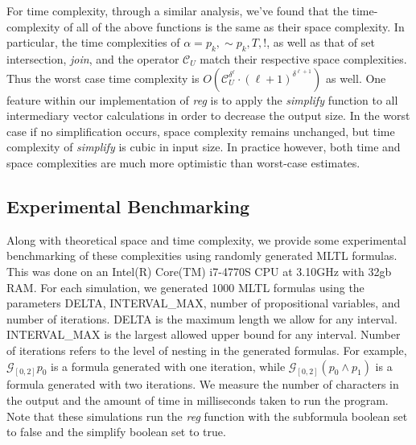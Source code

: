 \documentclass[runningheads]{llncs}
\begin{document}
For time complexity, through a similar analysis, we've found that the time-complexity of all of the above functions is the same as their space complexity. In particular, the time complexities of $\alpha = p_k, \scriptstyle{\sim}\textstyle p_k, T, !$, as well as that of set intersection, \textit{join}, and the operator $\mathcal{C}_U$ match their respective space complexities. Thus the worst case time complexity is $O(\mathcal{C}_U^{\delta ^ \ell} \cdot (\ell + 1)^{\delta^{\ell + 1}})$ as well. 
One feature within our implementation of \textit{reg} is to apply the \textit{simplify} function to all intermediary vector calculations in order to decrease the output size. In the worst case if no simplification occurs, space complexity remains unchanged, but time complexity of \textit{simplify} is cubic in input size. In practice however, both time and space complexities are much more optimistic than worst-case estimates. 
 
\subsection{Experimental Benchmarking}
 Along with theoretical space and time complexity, we provide some experimental benchmarking of these complexities using randomly generated MLTL formulas.
This was done on an Intel(R) Core(TM) i7-4770S CPU at 3.10GHz with 32gb RAM.
For each simulation, we generated 1000 MLTL formulas using the parameters DELTA, INTERVAL\_MAX, number of propositional variables, and number of iterations. DELTA is the maximum length we allow for any interval. INTERVAL\_MAX is the largest allowed upper bound for any interval. Number of iterations refers to the level of nesting in the generated formulas. For example, $\mathcal{G}_{[0,2]}p_0$ is a formula generated with one iteration, while $\mathcal{G}_{[0,2]}(p_0 \land p_1)$ is a formula generated with two iterations. We measure the number of characters in the output and the amount of time in milliseconds taken to run the program. Note that these simulations run the \textit{reg} function with the subformula boolean set to false and the simplify boolean set to true.
\end{document}
